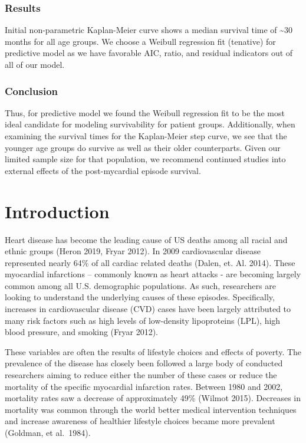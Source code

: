 \documentclass[
]{article}
\begin{document}
\hypertarget{results}{%
\subsubsection{Results}\label{results}}

Initial non-parametric Kaplan-Meier curve shows a median survival time
of \textasciitilde30 months for all age groups. We choose a Weibull
regression fit (tenative) for predictive model as we have favorable AIC,
ratio, and residual indicators out of all of our model.

\hypertarget{conclusion}{%
\subsubsection{Conclusion}\label{conclusion}}

Thus, for predictive model we found the Weibull regression fit to be the
most ideal candidate for modeling survivability for patient groups.
Additionally, when examining the survival times for the Kaplan-Meier
step curve, we see that the younger age groups do survive as well as
their older counterparts. Given our limited sample size for that
population, we recommend continued studies into external effects of the
post-mycardial episode survival.

\hypertarget{introduction}{%
\section{Introduction}\label{introduction}}

Heart disease has become the leading cause of US deaths among all racial
and ethnic groups (Heron 2019, Fryar 2012). In 2009 cardiovascular
disease represented nearly 64\% of all cardiac related deaths (Dalen,
et. Al. 2014). These myocardial infarctions -- commonly known as heart
attacks - are becoming largely common among all U.S. demographic
populations. As such, researchers are looking to understand the
underlying causes of these episodes. Specifically, increases in
cardiovascular disease (CVD) cases have been largely attributed to many
risk factors such as high levels of low-density lipoproteins (LPL), high
blood pressure, and smoking (Fryar 2012).

These variables are often the results of lifestyle choices and effects
of poverty. The prevalence of the disease has closely been followed a
large body of conducted researchers aiming to reduce either the number
of these cases or reduce the mortality of the specific myocardial
infarction rates. Between 1980 and 2002, mortality rates saw a decrease
of approximately 49\% (Wilmot 2015). Decreases in mortality was common
through the world better medical intervention techniques and increase
awareness of healthier lifestyle choices became more prevalent (Goldman,
et al.~1984).
\end{document}
